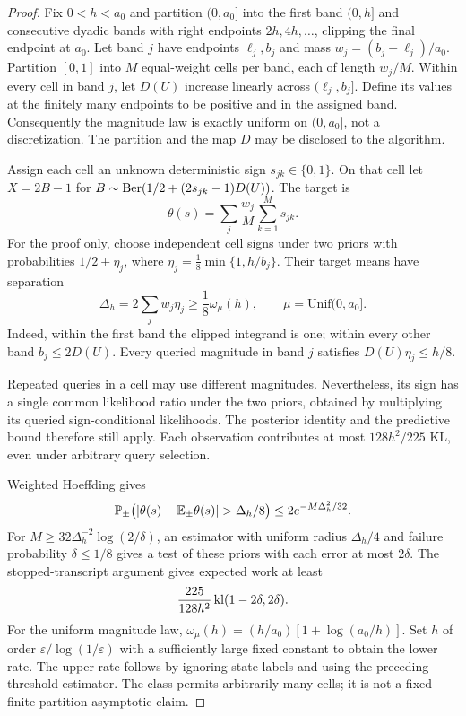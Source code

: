 \begin{proof}
Fix $0<h<a_0$ and partition $(0,a_0]$ into the first band $(0,h]$ and consecutive dyadic bands with right endpoints $2h,4h,\ldots$, clipping the final endpoint at $a_0$. Let band $j$ have endpoints $\ell_j,b_j$ and mass $w_j=(b_j-\ell_j)/a_0$. Partition $[0,1]$ into $M$ equal-weight cells per band, each of length $w_j/M$. Within every cell in band $j$, let $D(U)$ increase linearly across $(\ell_j,b_j]$. Define its values at the finitely many endpoints to be positive and in the assigned band. Consequently the magnitude law is exactly uniform on $(0,a_0]$, not a discretization. The partition and the map $D$ may be disclosed to the algorithm.

Assign each cell an unknown deterministic sign $s_{jk}\in\{0,1\}$. On that cell let $X=2B-1$ for $B\sim\operatorname{Ber}(1/2+(2s_{jk}-1)D(U))$. The target is
\[
\theta(s)=\sum_j\frac{w_j}{M}\sum_{k=1}^M s_{jk}.
\]
For the proof only, choose independent cell signs under two priors with probabilities $1/2\pm\eta_j$, where $\eta_j=\frac18\min\{1,h/b_j\}$. Their target means have separation
\[
\Delta_h=2\sum_jw_j\eta_j\ge\frac18\omega_\mu(h),\qquad \mu=\mathrm{Unif}(0,a_0].
\]
Indeed, within the first band the clipped integrand is one; within every other band $b_j\le2D(U)$. Every queried magnitude in band $j$ satisfies $D(U)\eta_j\le h/8$.

Repeated queries in a cell may use different magnitudes. Nevertheless, its sign has a single common likelihood ratio under the two priors, obtained by multiplying its queried sign-conditional likelihoods. The posterior identity and the predictive bound therefore still apply. Each observation contributes at most $128h^2/225$ KL, even under arbitrary query selection.

Weighted Hoeffding gives
\[
\Prob_\pm\bigl(|\theta(s)-\E_\pm\theta(s)|>\Delta_h/8\bigr)
\le2e^{-M\Delta_h^2/32}.
\]
For $M\ge32\Delta_h^{-2}\log(2/\delta)$, an estimator with uniform radius $\Delta_h/4$ and failure probability $\delta\le1/8$ gives a test of these priors with each error at most $2\delta$. The stopped-transcript argument gives expected work at least
\[
\frac{225}{128h^2}\operatorname{kl}(1-2\delta,2\delta).
\]
For the uniform magnitude law,
$\omega_\mu(h)=(h/a_0)[1+\log(a_0/h)]$. Set $h$ of order $\varepsilon/\log(1/\varepsilon)$ with a sufficiently large fixed constant to obtain the lower rate. The upper rate follows by ignoring state labels and using the preceding threshold estimator. The class permits arbitrarily many cells; it is not a fixed finite-partition asymptotic claim.


\end{proof}
